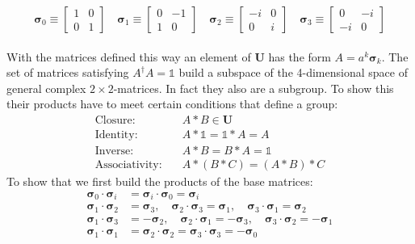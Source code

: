 \documentclass[11pt]{article}
\begin{document}
\begin{equation}
    \bm{\sigma}_0 \equiv \begin{bmatrix} 1 & 0 \\ 0 & 1 \end{bmatrix} \quad
    \bm{\sigma}_1 \equiv \begin{bmatrix} 0 & -1 \\ 1 & 0 \end{bmatrix} \quad 
    \bm{\sigma}_2 \equiv \begin{bmatrix} -i & 0 \\ 0 & i \end{bmatrix} \quad
    \bm{\sigma}_3 \equiv \begin{bmatrix} 0 & -i \\ -i & 0 \end{bmatrix}
\end{equation} \\
With the matrices defined this way an element of $\mathbf{U}$ has the form 
$A=a^k \bm{\sigma}_k$. 
The set of matrices satisfying $A^\dagger A = \mathbb{1}$ build a subspace of the 
4-dimensional space of general complex $2\times2$-matrices. In fact they also are
a subgroup. To  show this their products have to meet certain conditions that define 
a group:
\begin{subequations} \label{"GroupDefinition"}
    \begin{align}
        \text{Closure:}\quad& A*B \in \mathbf{U} \\
        \text{Identity:}\quad& A*\mathbb{1} = \mathbb{1} * A = A \\
        \text{Inverse:}\quad& A*B = B*A = \mathbb{1} \\
        \text{Associativity:}\quad& A*(B*C)=(A*B)*C
    \end{align}
\end{subequations}
To show that we first build the products of the base matrices:
\begin{equation}
    \begin{aligned}
    \bm{\sigma}_0 \cdot \bm{\sigma}_i &= \bm{\sigma}_i \cdot \bm{\sigma}_0 = \bm{\sigma}_i \\
    \bm{\sigma}_1 \cdot \bm{\sigma}_2 &= \bm{\sigma}_3, \quad
    \bm{\sigma}_2 \cdot \bm{\sigma}_3 = \bm{\sigma}_1, \quad
    \bm{\sigma}_3 \cdot \bm{\sigma}_1 = \bm{\sigma}_2 \\
    \bm{\sigma}_1 \cdot \bm{\sigma}_3 &= -\bm{\sigma}_2, \quad
    \bm{\sigma}_2 \cdot \bm{\sigma}_1 = -\bm{\sigma}_3, \quad
    \bm{\sigma}_3 \cdot \bm{\sigma}_2 = -\bm{\sigma}_1 \\
    \bm{\sigma}_1 \cdot \bm{\sigma}_1 &=
    \bm{\sigma}_2 \cdot \bm{\sigma}_2 =
    \bm{\sigma}_3 \cdot \bm{\sigma}_3 = -\bm{\sigma}_0 \\
    \end{aligned}
\end{equation}
\end{document}
